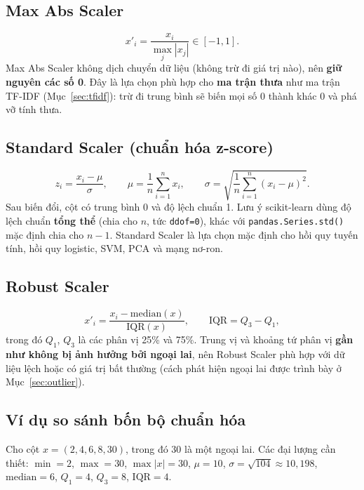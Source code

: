 \subsection{Max Abs Scaler}
\begin{equation}
    x'_i = \frac{x_i}{\max_j |x_j|} \in [-1, 1].
\end{equation}
Max Abs Scaler không dịch chuyển dữ liệu (không trừ đi giá trị nào), nên \textbf{giữ nguyên các số 0}. Đây là lựa chọn phù hợp cho \textbf{ma trận thưa} như ma trận TF-IDF (Mục~\ref{sec:tfidf}): trừ đi trung bình sẽ biến mọi số 0 thành khác 0 và phá vỡ tính thưa.

\subsection{Standard Scaler (chuẩn hóa z-score)}
\begin{equation}
    z_i = \frac{x_i - \mu}{\sigma}, \qquad \mu = \frac{1}{n}\sum_{i=1}^{n} x_i, \qquad \sigma = \sqrt{\frac{1}{n}\sum_{i=1}^{n} (x_i - \mu)^2}.
\end{equation}
Sau biến đổi, cột có trung bình 0 và độ lệch chuẩn 1. Lưu ý scikit-learn dùng độ lệch chuẩn \textbf{tổng thể} (chia cho $n$, tức \texttt{ddof=0}), khác với \texttt{pandas.Series.std()} mặc định chia cho $n-1$. Standard Scaler là lựa chọn mặc định cho hồi quy tuyến tính, hồi quy logistic, SVM, PCA và mạng nơ-ron.

\subsection{Robust Scaler}
\begin{equation}
    x'_i = \frac{x_i - \mathrm{median}(x)}{\mathrm{IQR}(x)}, \qquad \mathrm{IQR} = Q_3 - Q_1,
\end{equation}
trong đó $Q_1$, $Q_3$ là các phân vị 25\% và 75\%. Trung vị và khoảng tứ phân vị \textbf{gần như không bị ảnh hưởng bởi ngoại lai}, nên Robust Scaler phù hợp với dữ liệu lệch hoặc có giá trị bất thường (cách phát hiện ngoại lai được trình bày ở Mục~\ref{sec:outlier}).

\subsection{Ví dụ so sánh bốn bộ chuẩn hóa}

\begin{example}
Cho cột $x = (2, 4, 6, 8, 30)$, trong đó $30$ là một ngoại lai. Các đại lượng cần thiết:
$\min = 2$, $\max = 30$, $\max|x| = 30$, $\mu = 10$, $\sigma = \sqrt{104} \approx 10{,}198$, $\mathrm{median} = 6$, $Q_1 = 4$, $Q_3 = 8$, $\mathrm{IQR} = 4$.
\end{example}

